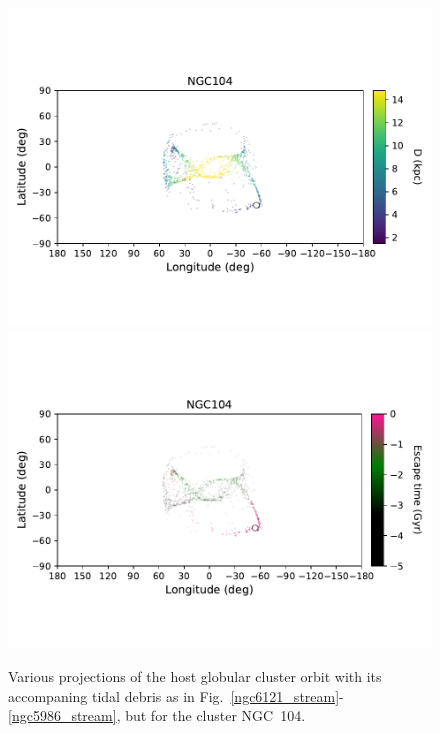 \begin{figure}
\begin{center}
                    \includegraphics[clip=true, trim = 0mm 20mm 0mm 10mm, width=\columnwidth]{images/PII_individual_NGC104_NGC104_LB_D.pdf}
                    \includegraphics[clip=true, trim = 0mm 20mm 0mm 10mm, width=\columnwidth]{images/PII_individual_NGC104_NGC104_LB_tesc.pdf}
                \end{center}
                \caption[]{Various projections of the host globular cluster orbit with its accompaning tidal debris as in Fig.~\ref{ngc6121_stream}-\ref{ngc5986_stream}, but for the cluster NGC~104. \label{ngc104_stream}}
            \end{figure}
            \onecolumn


